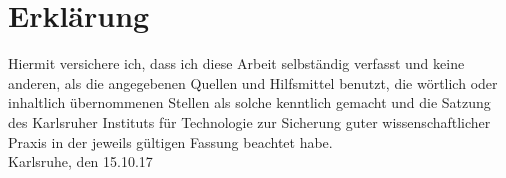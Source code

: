 \documentclass[12pt,a4paper]{scrartcl}
\theoremstyle{italic}
\theoremstyle{plain}
\begin{document}



\newpage

\section*{Erklärung}

Hiermit versichere ich, dass ich diese Arbeit selbständig verfasst und keine anderen, als die angegebenen Quellen und Hilfsmittel benutzt, die wörtlich oder inhaltlich übernommenen Stellen als solche kenntlich gemacht und die Satzung des Karlsruher Instituts für Technologie zur Sicherung guter wissenschaftlicher Praxis in der jeweils gültigen Fassung beachtet habe. \\[2ex] 

\noindent
Karlsruhe, den 15.10.17\\[5ex]

\newpage
\end{document}
